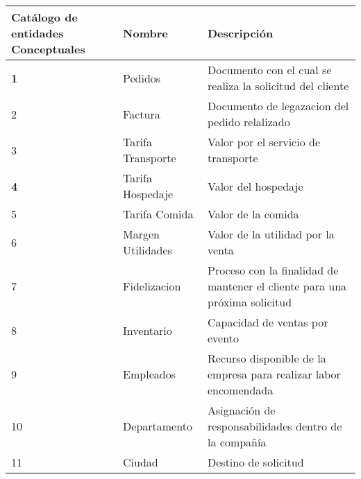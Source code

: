 \begin{table}[H]
\centering
\resizebox{17cm}{!} {
\begin{tabular}{|l|l|l|}
\hline
\textbf{Catálogo de entidades Conceptuales} & \textbf{Nombre} & \textbf{Descripción} \\ \hline
\textbf{1} & Pedidos & Documento con el cual se realiza la solicitud del cliente \\ \hline
2 & Factura & Documento de legazacion del pedido relalizado \\ \hline
3 & Tarifa Transporte & Valor por el servicio de transporte \\ \hline
\textbf{4} & Tarifa Hospedaje & Valor del hospedaje \\ \hline
5 & Tarifa Comida & Valor de la comida \\ \hline
6 & Margen Utilidades & Valor de la utilidad por la venta \\ \hline
7 & Fidelizacion & Proceso con la finalidad de mantener el cliente para una próxima solicitud \\ \hline
8 & Inventario & Capacidad de ventas por evento \\ \hline
9 & Empleados & Recurso disponible de la empresa para realizar labor encomendada \\ \hline
10 & Departamento & Asignación de responsabilidades dentro de la compañía \\ \hline
11 & Ciudad & Destino de solicitud \\ \hline
\end{tabular}
}
\end{table}
